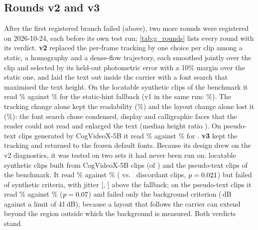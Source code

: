 

\subsection{Rounds v2 and v3}
\label{sec:supp_g_rounds}
After the first registered branch failed (above), two more rounds were registered on 2026-10-24, each before its own test run; \cref{tab:g_rounds} lists every round with its verdict. \textbf{v2} replaced the per-frame tracking by one choice per clip among a static, a homography and a dense-flow trajectory, each smoothed jointly over the clip and selected by its held-out photometric error with a 10\% margin over the static one, and laid the text out inside the carrier with a font search that maximised the text height. On the \gVtwoSynN{} locatable synthetic clips of the benchmark it read \gVtwoSynRead\% against \gVtwoSynFb\% for the static-hint fallback (v1 in the same run: \gVoneSynRead\%). The tracking change alone kept the readability (\gVtwoAoneRead\%) and the layout change alone lost it (\gVtwoAtwoRead\%): the font search chose condensed, display and calligraphic faces that the reader could not read and enlarged the text (median height ratio \gVtwoHeight). On \gVtwoNatN{} pseudo-text clips generated by CogVideoX-5B it read \gVtwoNatRead\% against \gVtwoNatBone\% for \method. \textbf{v3} kept the tracking and returned to the frozen default fonts. Because its design drew on the v2 diagnostics, it was tested on two sets it had never been run on: \gVthreeSynN{} locatable synthetic clips built from CogVideoX-5B clips (of \gVthreeSynAll) and the \lthreeLtwo{} pseudo-text clips of the benchmark. It read \gVthreeSynRead\% against \gVthreeSynFb\% (\gVthreeWins{} vs.\ \gVthreeLosses{} discordant clips, $p=0.021$) but failed \gVthreeFailed{} of \gVthreeCriteria{} synthetic criteria, with jitter \gVthreeJit{} [\gVthreeJitLo, \gVthreeJitHi] above the fallback; on the pseudo-text clips it read \gVthreeLtwoRead\% against \gVthreeLtwoBone\% ($p=0.07$) and failed only the background criterion (\gVthreeLtwoBg\,dB against a limit of 41\,dB), because a layout that follows the carrier can extend beyond the region outside which the background is measured. Both verdicts stand.

